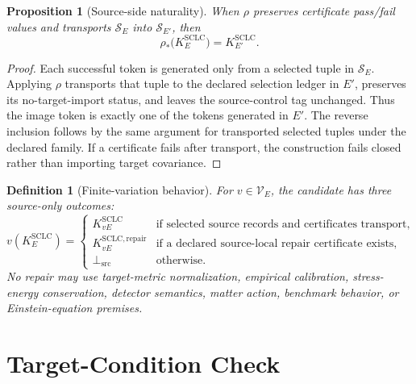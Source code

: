 \documentclass[11pt]{article}
\newcommand{\BottomSrc}{\bot_{\mathrm{src}}}
\newtheorem{definition}{Definition}
\newtheorem{proposition}{Proposition}
\begin{document}
\begin{proposition}[Source-side naturality]
When \(\rho\) preserves certificate pass/fail values and transports
\(\mathcal{S}_E\) into \(\mathcal{S}_{E'}\), then
\[
  \rho_*\bigl(K^{\mathrm{SCLC}}_E\bigr)
  =
  K^{\mathrm{SCLC}}_{E'}.
\]
\end{proposition}

\begin{proof}
Each successful token is generated only from a selected tuple in
\(\mathcal{S}_E\). Applying \(\rho\) transports that tuple to the declared
selection ledger in \(E'\), preserves its no-target-import status, and leaves
the source-control tag unchanged. Thus the image token is exactly one of the
tokens generated in \(E'\). The reverse inclusion follows by the same
argument for transported selected tuples under the declared family. If a
certificate fails after transport, the construction fails closed rather than
importing target covariance.
\end{proof}

\begin{definition}[Finite-variation behavior]
For \(v\in\mathcal{V}_E\), the candidate has three source-only outcomes:
\[
  v(K^{\mathrm{SCLC}}_E)=
  \begin{cases}
    K^{\mathrm{SCLC}}_{vE} & \text{if selected source records and certificates transport,}\\
    K^{\mathrm{SCLC,repair}}_{vE} & \text{if a declared source-local repair certificate exists,}\\
    \BottomSrc & \text{otherwise.}
  \end{cases}
\]
No repair may use target-metric normalization, empirical calibration,
stress-energy conservation, detector semantics, matter action, benchmark
behavior, or Einstein-equation premises.
\end{definition}

\section{Target-Condition Check}
\end{document}

